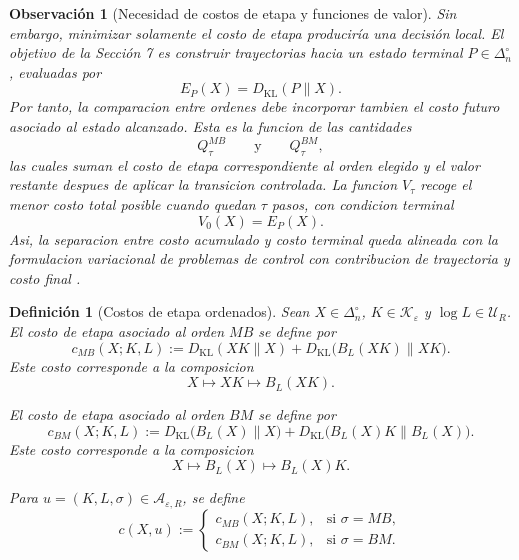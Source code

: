 \documentclass[12pt]{article}
\newtheorem{definicion}{Definición}[section]
\newtheorem{observacion}{Observación}[section]
\begin{document}
\begin{observacion}[Necesidad de costos de etapa y funciones de valor]
Sin embargo, minimizar solamente el costo de etapa produciría una decisión local. El objetivo de la Sección 7 es construir trayectorias hacia un estado terminal \(P\in\Delta_n^\circ\), evaluadas por
\[
E_P(X)=D_{\mathrm{KL}}(P\|X).
\]
Por tanto, la comparacion entre ordenes debe incorporar tambien el costo futuro asociado al estado alcanzado. Esta es la funcion de las cantidades
\[
Q_\tau^{MB}
\qquad\text{y}\qquad
Q_\tau^{BM},
\]
las cuales suman el costo de etapa correspondiente al orden elegido y el valor restante despues de aplicar la transicion controlada. La funcion \(V_\tau\) recoge el menor costo total posible cuando quedan \(\tau\) pasos, con condicion terminal
\[
V_0(X)=E_P(X).
\]
Asi, la separacion entre costo acumulado y costo terminal queda alineada con la formulacion variacional de problemas de control con contribucion de trayectoria y costo final \citep{Kappen2005LinearTheoryForControlOfNonLinearStochasticSystems}.
\end{observacion}

\begin{definicion}[Costos de etapa ordenados]\label{def:costos_etapa_ordenados}
Sean \(X\in\Delta_n^\circ\), \(K\in\mathcal K_\varepsilon\) y \(\log L\in\mathcal U_R\). El costo de etapa asociado al orden \(MB\) se define por
\[
c_{MB}(X;K,L)
:=
D_{\mathrm{KL}}(XK\|X)
+
D_{\mathrm{KL}}\bigl(B_L(XK)\|XK\bigr).
\]
Este costo corresponde a la composicion
\[
X
\longmapsto
XK
\longmapsto
B_L(XK).
\]

El costo de etapa asociado al orden \(BM\) se define por
\[
c_{BM}(X;K,L)
:=
D_{\mathrm{KL}}\bigl(B_L(X)\|X\bigr)
+
D_{\mathrm{KL}}\bigl(B_L(X)K\|B_L(X)\bigr).
\]
Este costo corresponde a la composicion
\[
X
\longmapsto
B_L(X)
\longmapsto
B_L(X)K.
\]

Para \(u=(K,L,\sigma)\in\mathcal A_{\varepsilon,R}\), se define
\[
c(X,u)
:=
\begin{cases}
c_{MB}(X;K,L), & \text{si } \sigma=MB,\\[2mm]
c_{BM}(X;K,L), & \text{si } \sigma=BM.
\end{cases}
\]
\end{definicion}
\end{document}

